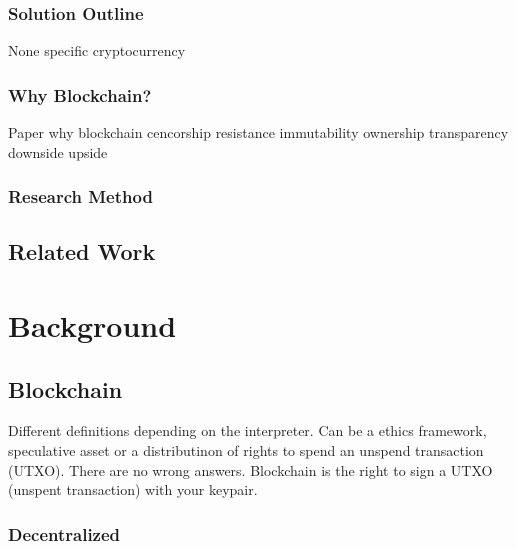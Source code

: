\documentclass[Nomencl]{DylanMaster}
\begin{document}
\subsubsection{Solution Outline}

None specific cryptocurrency

\subsubsection{Why Blockchain?}

Paper why blockchain
cencorship resistance
immutability
ownership
transparency
downside
upside

\subsubsection{Research Method}

\subsection{Related Work}

\section{Background}

\subsection{Blockchain}

Different definitions depending on the interpreter. Can be a ethics framework, speculative asset or a distributinon of rights to spend an unspend transaction (UTXO). There are no wrong answers.
Blockchain is the right to sign a UTXO (unspent transaction) with your keypair.

\subsubsection{Decentralized}
\end{document}
